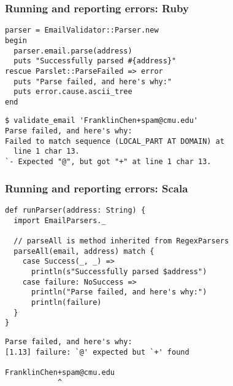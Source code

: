 \begin{frame}[fragile]
  \frametitle{Running and reporting errors: Ruby}

  \begin{verbatim}
parser = EmailValidator::Parser.new
begin
  parser.email.parse(address)
  puts "Successfully parsed #{address}"
rescue Parslet::ParseFailed => error
  puts "Parse failed, and here's why:"
  puts error.cause.ascii_tree
end
  \end{verbatim}

  \begin{verbatim}
$ validate_email 'FranklinChen+spam@cmu.edu'
Parse failed, and here's why:
Failed to match sequence (LOCAL_PART AT DOMAIN) at
  line 1 char 13.
`- Expected "@", but got "+" at line 1 char 13.
  \end{verbatim}
\end{frame}

\begin{frame}[fragile]
  \frametitle{Running and reporting errors: Scala}

  \begin{verbatim}
def runParser(address: String) {
  import EmailParsers._

  // parseAll is method inherited from RegexParsers
  parseAll(email, address) match {
    case Success(_, _) =>
      println(s"Successfully parsed $address")
    case failure: NoSuccess =>
      println("Parse failed, and here's why:")
      println(failure)
  }
}
  \end{verbatim}

  \begin{verbatim}
Parse failed, and here's why:
[1.13] failure: `@' expected but `+' found

FranklinChen+spam@cmu.edu
            ^
  \end{verbatim}
\end{frame}

